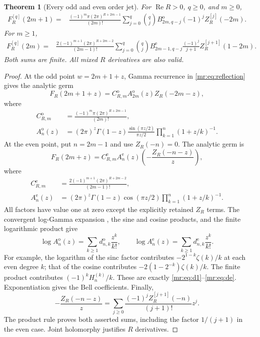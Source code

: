 \documentclass[11pt,letterpaper]{article}
\newtheorem{theorem}{Theorem}[section]
\theoremstyle{definition}\newtheorem{definition}[theorem]{Definition}
\theoremstyle{remark}\newtheorem{remark}[theorem]{Remark}
\newcommand{\Rea}{\operatorname{Re}}\newcommand{\Ima}{\operatorname{Im}}
\begin{document}
\begin{theorem}[Every odd and even order jet]\label{mr:thm:resonance}
For $\Rea R>0$, $q\ge0$, and $m\ge0$,
\begin{align}
 F_R^{[q]}(2m+1)
 ={}&\frac{(-1)^m\pi(2\pi)^{R+2m-1}}{(2m)!}
 \sum_{j=0}^q\binom qj B_{2m,q-j}^{\mathrm o}(-1)^j
                           Z_R^{[j]}(-2m).
 \label{mr:eq:oddjet}
\end{align}
For $m\ge1$,
\begin{align}
 F_R^{[q]}(2m)
 ={}&\frac{2(-1)^{m+1}(2\pi)^{R+2m-2}}{(2m-1)!}
 \sum_{j=0}^q\binom qj B_{2m-1,q-j}^{\mathrm e}
           \frac{(-1)^j}{j+1}Z_R^{[j+1]}(1-2m).
 \label{mr:eq:evenjet}
\end{align}
Both sums are finite. All mixed $R$ derivatives are also valid.
\end{theorem}
\begin{proof}
At the odd point $w=2m+1+z$, Gamma recurrence in
\eqref{mr:eq:reflection} gives the analytic germ
\begin{equation}\label{mr:eq:oddgerm}
 F_R(2m+1+z)=C_{R,m}^{\mathrm o}A_{2m}^{\mathrm o}(z)Z_R(-2m-z),
\end{equation}
where
\begin{align}
 C_{R,m}^{\mathrm o}&=\frac{(-1)^m\pi(2\pi)^{R+2m-1}}{(2m)!},\nonumber\\
 A_n^{\mathrm o}(z)&=(2\pi)^z\Gamma(1-z)
     \frac{\sin(\pi z/2)}{\pi z/2}
     \prod_{k=1}^n(1+z/k)^{-1}.\label{mr:eq:Ao}
\end{align}
At the even point, put $n=2m-1$ and use $Z_R(-n)=0$. The analytic germ is
\begin{equation}\label{mr:eq:evengerm}
 F_R(2m+z)=C_{R,m}^{\mathrm e}A_n^{\mathrm e}(z)
                         \left(-\frac{Z_R(-n-z)}z\right),
\end{equation}
where
\begin{align}
 C_{R,m}^{\mathrm e}&=\frac{2(-1)^{m+1}(2\pi)^{R+2m-2}}{(2m-1)!},\nonumber\\
 A_n^{\mathrm e}(z)&=(2\pi)^z\Gamma(1-z)\cos(\pi z/2)
                    \prod_{k=1}^n(1+z/k)^{-1}.\label{mr:eq:Ae}
\end{align}
All factors have value one at zero except the explicitly retained $Z_R$
terms. The convergent log-Gamma expansion \cite{GammaSeries}, the
sine and cosine products, and the finite logarithmic product give
\[
 \log A_n^{\mathrm o}(z)=\sum_{k\ge1}d^{\mathrm o}_{n,k}\frac{z^k}{k!},
 \qquad
 \log A_n^{\mathrm e}(z)=\sum_{k\ge1}d^{\mathrm e}_{n,k}\frac{z^k}{k!}.
\]
For example, the logarithm of the sinc factor contributes
$-2^{1-k}\zeta(k)/k$ at each even degree $k$; that of the cosine
contributes $-2(1-2^{-k})\zeta(k)/k$. The finite product contributes
$(-1)^kH_n^{(k)}/k$. These are exactly
\eqref{mr:eq:d1}--\eqref{mr:eq:de}.
Exponentiation gives the Bell coefficients. Finally,
\[
 -\frac{Z_R(-n-z)}z
 =\sum_{j\ge0}\frac{(-1)^jZ_R^{[j+1]}(-n)}{(j+1)!}z^j.
\]
The product rule proves both asserted sums, including the factor
$1/(j+1)$ in the even case. Joint holomorphy justifies $R$ derivatives.
\end{proof}
\end{document}
